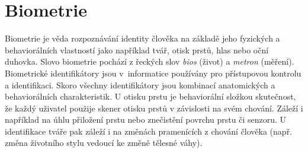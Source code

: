 


\chapter{Biometrie} 
Biometrie je věda rozpoznávání identity člověka na základě jeho fyzických a behaviorálních vlastností jako například tvář, otisk prstů, hlas nebo oční duhovka. \cite{Jain2008} Slovo biometrie pochází z řeckých slov \textit{bios} (život) a \textit{metron} (měření). Biometrické identifikátory jsou v~informatice používány pro přístupovou kontrolu a identifikaci. Skoro všechny identifikátory jsou kombinací anatomických a behaviorálních charakteristik. U otisku prstu je behaviorální složkou skutečnost, že každý uživatel použije skener otisku prstů v závislosti na svém chování. Záleží i například na úhlu přiložení prstu nebo znečistění povrchu prstu či senzoru. U identifikace tváře pak záleží i na změnách pramenících z chování člověka (např. změna životního stylu vedoucí ke změně tělesné váhy). \cite{Maltoni2009}
